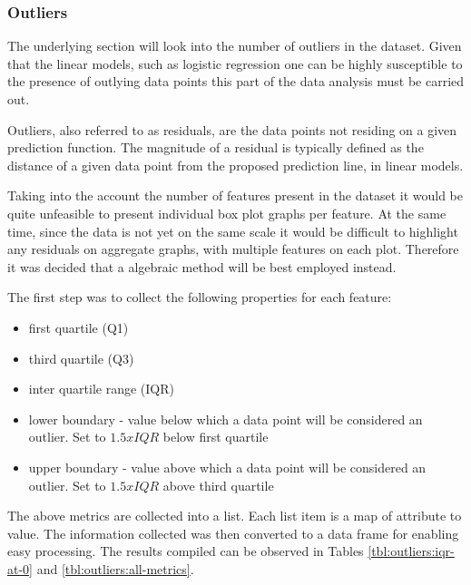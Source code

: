 \subsubsection{Outliers}\label{sec:impl-data-analysis:outliers}
The underlying section will look into the number of outliers in the dataset. Given that the linear models, such as logistic regression one can be highly susceptible to the presence of outlying data points this part of the data analysis must be carried out.

Outliers, also referred to as residuals, are the data points not residing on a given prediction function. The magnitude of a residual is typically defined as the distance of a given data point from the proposed prediction line, in linear models.

Taking into the account the number of features present in the dataset it would be quite unfeasible to present individual box plot graphs per feature. At the same time, since the data is not yet on the same scale it would be difficult to highlight any residuals on aggregate graphs, with multiple features on each plot. Therefore it was decided that a algebraic method will be best employed instead.

The first step was to collect the following properties for each feature:
\begin{itemize}
    \item first quartile (Q1)
    \item third quartile (Q3)
    \item inter quartile range (IQR)
    \item lower boundary - value below which a data point will be considered an outlier. Set to $1.5x IQR$ below first quartile
    \item upper boundary - value above which a data point will be considered an outlier. Set to $1.5x IQR$ above third quartile
\end{itemize}

The above metrics are collected into a list. Each list item is a map of attribute to value. The information collected was then converted to a data frame for enabling easy processing. The results compiled can be observed in Tables \ref{tbl:outliers:iqr-at-0} and \ref{tbl:outliers:all-metrics}.

